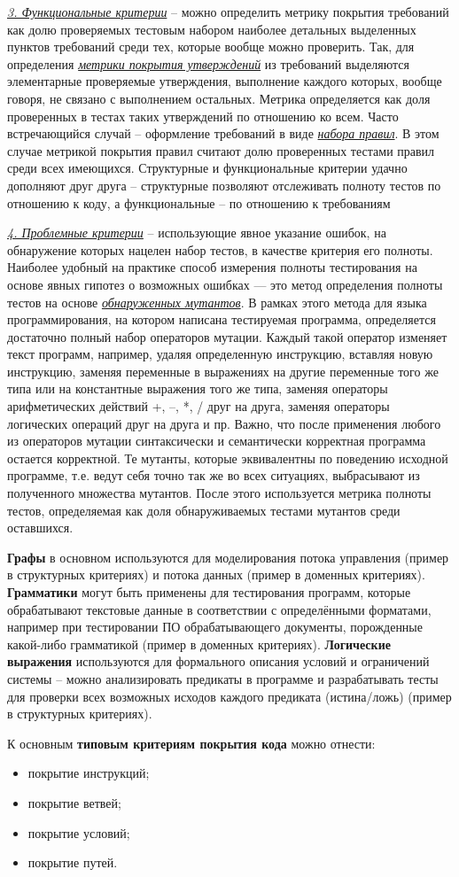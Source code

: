 \underline{\textit{3. Функциональные критерии}} -- можно определить метрику покрытия требований как долю проверяемых тестовым набором наиболее детальных выделенных пунктов требований среди тех, которые вообще можно проверить. Так, для определения \underline{\textit{метрики покрытия утверждений}} из требований выделяются элементарные проверяемые утверждения, выполнение каждого которых, вообще говоря, не связано с выполнением остальных. Метрика определяется как доля проверенных в тестах таких утверждений по отношению ко всем. Часто встречающийся случай -- оформление требований в виде \underline{\textit{набора правил}}. В этом случае метрикой покрытия правил считают долю проверенных тестами правил среди всех имеющихся. Структурные и функциональные критерии удачно дополняют друг друга -- структурные позволяют отслеживать полноту тестов по отношению к коду, а функциональные -- по отношению к требованиям

\underline{\textit{4. Проблемные критерии}} -- использующие явное указание ошибок, на обнаружение которых нацелен набор тестов, в качестве критерия его полноты. Наиболее удобный на практике способ измерения полноты тестирования на основе явных гипотез о возможных ошибках — это метод определения полноты тестов на основе \underline{\textit{обнаруженных мутантов}}. В рамках этого метода для языка программирования, на котором написана тестируемая программа, определяется достаточно полный набор операторов мутации. Каждый такой оператор изменяет текст программ, например, удаляя определенную инструкцию, вставляя новую инструкцию, заменяя переменные в выражениях на другие переменные того же типа или на константные выражения того же типа, заменяя операторы арифметических действий +, –, *, / друг на друга, заменяя операторы логических операций друг на друга и пр. Важно, что после применения любого из операторов мутации синтаксически и семантически корректная программа остается корректной. Те мутанты, которые эквивалентны по поведению исходной программе, т.е. ведут себя точно так же во всех ситуациях, выбрасывают из полученного множества мутантов. После этого используется метрика полноты тестов, определяемая как доля обнаруживаемых тестами мутантов среди оставшихся.

\textbf{Графы} в основном используются для моделирования потока управления (пример в структурных критериях) и потока данных (пример в доменных критериях). \textbf{Грамматики} могут быть применены для тестирования программ, которые обрабатывают текстовые данные в соответствии с определёнными форматами, например при тестировании ПО обрабатывающего документы, порожденные какой-либо грамматикой (пример в доменных критериях). \textbf{Логические выражения} используются для формального описания условий и ограничений системы -- можно анализировать предикаты в программе и разрабатывать тесты для проверки всех возможных исходов каждого предиката (истина/ложь) (пример в структурных критериях).

К основным \textbf{типовым критериям покрытия кода} можно отнести:

\begin{itemize}
    \item покрытие инструкций;
    \item покрытие ветвей;
    \item покрытие условий;
    \item покрытие путей.
\end{itemize}

